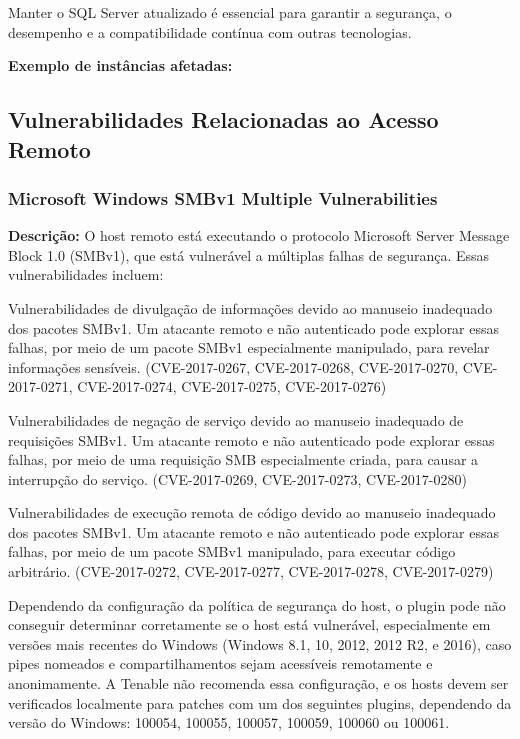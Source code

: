 \documentclass[a4paper,12pt]{article}
\begin{document}
Manter o SQL Server atualizado é essencial para garantir a segurança, o desempenho e a compatibilidade contínua com outras tecnologias.


\textbf{Exemplo de instâncias afetadas:}
\begin{itemize}
\end{itemize}



\subsection{Vulnerabilidades Relacionadas ao Acesso Remoto}

\subsubsection{Microsoft Windows SMBv1 Multiple Vulnerabilities}

\textbf{Descrição:}
O host remoto está executando o protocolo Microsoft Server Message Block 1.0 (SMBv1), que está vulnerável a múltiplas falhas de segurança. Essas vulnerabilidades incluem:

Vulnerabilidades de divulgação de informações devido ao manuseio inadequado dos pacotes SMBv1. Um atacante remoto e não autenticado pode explorar essas falhas, por meio de um pacote SMBv1 especialmente manipulado, para revelar informações sensíveis. (CVE-2017-0267, CVE-2017-0268, CVE-2017-0270, CVE-2017-0271, CVE-2017-0274, CVE-2017-0275, CVE-2017-0276)

Vulnerabilidades de negação de serviço devido ao manuseio inadequado de requisições SMBv1. Um atacante remoto e não autenticado pode explorar essas falhas, por meio de uma requisição SMB especialmente criada, para causar a interrupção do serviço. (CVE-2017-0269, CVE-2017-0273, CVE-2017-0280)

Vulnerabilidades de execução remota de código devido ao manuseio inadequado dos pacotes SMBv1. Um atacante remoto e não autenticado pode explorar essas falhas, por meio de um pacote SMBv1 manipulado, para executar código arbitrário. (CVE-2017-0272, CVE-2017-0277, CVE-2017-0278, CVE-2017-0279)

Dependendo da configuração da política de segurança do host, o plugin pode não conseguir determinar corretamente se o host está vulnerável, especialmente em versões mais recentes do Windows (Windows 8.1, 10, 2012, 2012 R2, e 2016), caso pipes nomeados e compartilhamentos sejam acessíveis remotamente e anonimamente. A Tenable não recomenda essa configuração, e os hosts devem ser verificados localmente para patches com um dos seguintes plugins, dependendo da versão do Windows: 100054, 100055, 100057, 100059, 100060 ou 100061.
\end{document}
